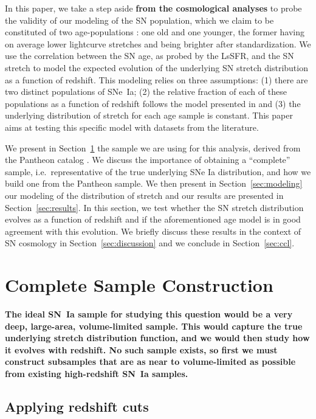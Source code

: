 \documentclass[referee]{aa}
\begin{document}
In this paper, we take a step aside \textbf{from the cosmological analyses} to
probe the validity of our modeling of the SN population, which we claim to be
constituted of two age-populations \citep{rigault2013,rigault2015,rigault2020}:
one old and one younger, the former having on average lower lightcurve stretches
and being brighter after standardization. We use the correlation between the SN
age, as probed by the LsSFR, and the SN stretch to model the expected evolution
of the underlying SN stretch distribution as a function of redshift. This
modeling relies on three assumptions: (1) there are two distinct populations of
SNe~Ia; (2) the relative fraction of each of these populations as a function of
redshift follows the model presented in \cite{rigault2020} and (3) the
underlying distribution of stretch for each age sample is constant. This paper
aims at testing this specific model with datasets from the literature. 

We present in Section~\ref{sec:sample} the sample we are using for this
analysis, derived from the Pantheon catalog \citep{scolnic2018a}. We discuss the
importance of obtaining a ``complete'' sample, i.e.\ representative of the true
underlying SNe Ia distribution, and how we build one from the Pantheon sample.
We then present in Section~\ref{sec:modeling} our modeling of the distribution
of stretch and our results are presented in Section~\ref{sec:results}. In this
section, we test whether the SN stretch distribution evolves as a function of
redshift and if the aforementioned age model is in good agreement with this
evolution. We briefly discuss these results in the context of SN cosmology in
Section~\ref{sec:discussion} and we conclude in Section~\ref{sec:ccl}.

\section{Complete Sample Construction}\label{sec:sample}

\textbf{The ideal SN~Ia sample for studying this question would be a very deep,
    large-area, volume-limited sample. This would capture the true underlying
    stretch distribution function, and we would then study how it evolves with
    redshift. No such sample exists, so first we must construct subsamples that
are as near to volume-limited as possible from existing high-redshift SN~Ia
samples.}

\subsection{Applying redshift cuts}\label{ssec:cuts}
\end{document}
